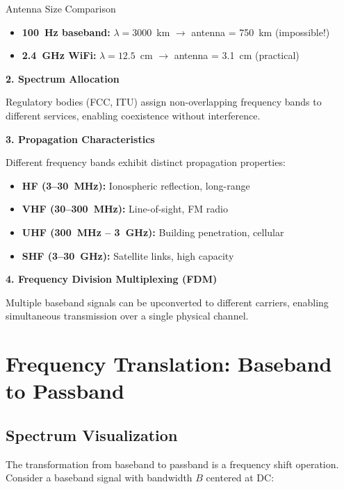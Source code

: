 \begin{calloutbox}{Antenna Size Comparison}
\begin{itemize}
\item \textbf{100~Hz baseband:} $\lambda = 3000$~km $\rightarrow$ antenna = 750~km (impossible!)
\item \textbf{2.4~GHz WiFi:} $\lambda = 12.5$~cm $\rightarrow$ antenna = 3.1~cm (practical)
\end{itemize}
\end{calloutbox}

\textbf{2. Spectrum Allocation}

Regulatory bodies (FCC, ITU) assign non-overlapping frequency bands to different services, enabling coexistence without interference.

\textbf{3. Propagation Characteristics}

Different frequency bands exhibit distinct propagation properties:
\begin{itemize}
\item \textbf{HF (3--30~MHz):} Ionospheric reflection, long-range
\item \textbf{VHF (30--300~MHz):} Line-of-sight, FM radio
\item \textbf{UHF (300~MHz -- 3~GHz):} Building penetration, cellular
\item \textbf{SHF (3--30~GHz):} Satellite links, high capacity
\end{itemize}

\textbf{4. Frequency Division Multiplexing (FDM)}

Multiple baseband signals can be upconverted to different carriers, enabling simultaneous transmission over a single physical channel.

\section{Frequency Translation: Baseband to Passband}

\subsection{Spectrum Visualization}

The transformation from baseband to passband is a frequency shift operation. Consider a baseband signal with bandwidth $B$ centered at DC:

